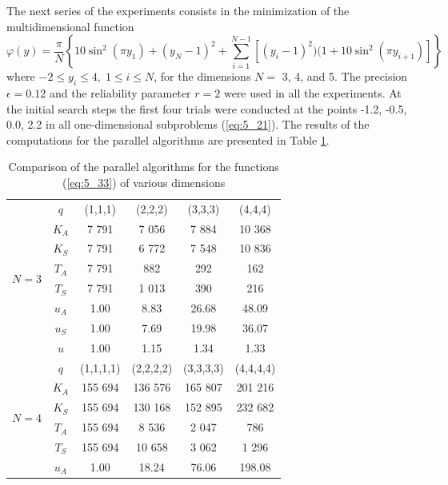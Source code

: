 The next series of the experiments consists in the minimization of the multidimensional function \cite{5_LucidiPiccioni}
\begin{equation}
\label{eq:5_33}
\varphi(y)=\frac{\pi}{N}\left\{10\sin^2(\pi y_1)+(y_N-1)^2+\sum_{i=1}^{N-1}{[(y_i-1)^2)(1+10\sin^2(\pi y_{i+1})]}    \right\}
\end{equation}
where $-2\leq y_i\leq 4,\;1\leq i\leq N$, for the dimensions $N=$ 3, 4, and 5. The precision $\epsilon=0.12$ and the reliability parameter $r = 2$ were used in all the experiments. At the initial search steps the first four trials were conducted at the points {-1.2, -0.5, 0.0, 2.2} in all one-dimensional subproblems (\ref{eq:5_21}). The results of the computations for the parallel algorithms are presented in Table \ref{tab:5_2}.
\begin{table}
\caption{Comparison of the parallel algorithms for the functions (\ref{eq:5_33}) of various dimensions}
\label {tab:5_2}
\begin{center}
\begin{tabular}{|c|c|c|c|c|c|}
\hline
\multirow{8}{*}{$N=3$} & $q$ & (1,1,1) & (2,2,2) & (3,3,3) & (4,4,4) \\
\cline{2-6}
		& $K_A$ &  7 791  &  7 056  &  7 884  &  10 368   \\
\cline{2-6}
		& $K_S$ &  7 791  &  6 772  &  7 548  &  10 836   \\
\cline{2-6}
		& $T_A$ &  7 791  &   882  &   292  &    162   \\	
\cline{2-6}
		& $T_S$ &  7 791  &  1 013  &   390  &    216   \\		
\cline{2-6}
		& $u_A$ &  1.00  &  8.83  & 26.68  &  48.09   \\
\cline{2-6}
		& $u_S$ &  1.00  &  7.69  & 19.98  &  36.07   \\
\cline{2-6}
		& $u$   &  1.00  &  1.15  &  1.34  &   1.33   \\
\hline
\hline
\multirow{8}{*}{$N=4$} & $q$ & (1,1,1,1) & (2,2,2,2) & (3,3,3,3) & (4,4,4,4) \\  
\cline{2-6}
		& $K_A$ &  155 694  &  136 576  &  165 807  &  201 216   \\
\cline{2-6}
		& $K_S$ &  155 694  &  130 168  &  152 895  &  232 682   \\
\cline{2-6}
		& $T_A$ &  155 694  &  8 536  &   2 047  &   786   \\	
\cline{2-6}
		& $T_S$ &  155 694  & 10 658  &  3 062  &    1 296   \\		
\cline{2-6}
		& $u_A$ &  1.00  & 18.24  & 76.06  & 198.08   \\

\end{tabular}
\end{center}
\end{table}

